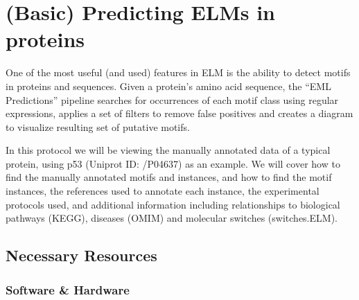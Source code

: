 \section{(Basic) Predicting ELMs in proteins}
\label{sec:predicting_p53}

One of the most useful (and used) features in ELM is the ability to
detect motifs in proteins and sequences. Given a protein's amino acid
sequence, the ``EML Predictions'' pipeline searches for occurrences of
each motif class using regular expressions, applies a set of filters to
remove false positives and creates a diagram to visualize resulting
set of putative motifs.

In this protocol we will be viewing the manually annotated data of a
typical protein, using p53 (Uniprot ID: /P04637) as an
example. We will cover how to find the manually annotated motifs and instances,
and how to find the motif instances, the references used to annotate each
instance, the experimental protocols used, and additional information including
relationships to biological pathways (KEGG), diseases (OMIM) and molecular
switches (switches.ELM).

%
%
\subsection{Necessary Resources}
\subsubsection{Software \& Hardware}



